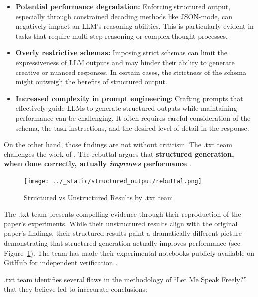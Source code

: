 \begin{itemize}
    \item \textbf{Potential performance degradation:} Enforcing structured output, especially through constrained decoding methods like JSON-mode, can negatively impact an LLM's reasoning abilities. This is particularly evident in tasks that require multi-step reasoning or complex thought processes.
    
    \item \textbf{Overly restrictive schemas:} Imposing strict schemas can limit the expressiveness of LLM outputs and may hinder their ability to generate creative or nuanced responses. In certain cases, the strictness of the schema might outweigh the benefits of structured output.
    
    \item \textbf{Increased complexity in prompt engineering:} Crafting prompts that effectively guide LLMs to generate structured outputs while maintaining performance can be challenging. It often requires careful consideration of the schema, the task instructions, and the desired level of detail in the response.
\end{itemize}

On the other hand, those findings are not without criticism. The .txt team challenges the work of \cite{tam2024letspeakfreelystudy}. The rebuttal argues that \textbf{structured generation, when done correctly, actually \textit{improves} performance} \cite{dottxt2024demos}.

\begin{figure}[h]
\centering
\texttt{[image: ../\_static/structured\_output/rebuttal.png]}
\caption{Structured vs Unstructured Results by .txt team \cite{dottxt2024demos}}
\label{structured_vs_unstructured}
\end{figure}

The .txt team presents compelling evidence through their reproduction of the paper's experiments. While their unstructured results align with the original paper's findings, their structured results paint a dramatically different picture - demonstrating that structured generation actually improves performance (see Figure~\ref{structured_vs_unstructured}). The team has made their experimental notebooks publicly available on GitHub for independent verification \cite{dottxt2024demos}.

.txt team identifies several flaws in the methodology of ``Let Me Speak Freely?'' that they believe led to inaccurate conclusions:

